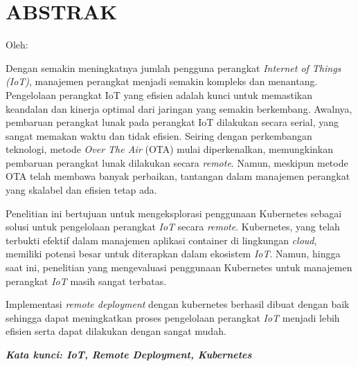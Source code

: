 \clearpage
\chapter*{ABSTRAK}
\begin{center}
  \center
  \begin{singlespace}
    \large\bfseries\MakeUppercase{\thetitle}
    
    \normalfont\normalsize
    Oleh:
    
    \bfseries \theauthor
  \end{singlespace}
\end{center}

\begin{singlespace}
  \small
  Dengan semakin meningkatnya jumlah pengguna perangkat \textit{Internet of Things (IoT)}, manajemen perangkat menjadi semakin kompleks dan menantang. Pengelolaan perangkat IoT yang efisien adalah kunci untuk memastikan keandalan dan kinerja optimal dari jaringan yang semakin berkembang. Awalnya, pembaruan perangkat lunak pada perangkat IoT dilakukan secara serial, yang sangat memakan waktu dan tidak efisien. Seiring dengan perkembangan teknologi, metode \textit{Over The Air} (OTA) mulai diperkenalkan, memungkinkan pembaruan perangkat lunak dilakukan secara \textit{remote}. Namun, meskipun metode OTA telah membawa banyak perbaikan, tantangan dalam manajemen perangkat yang skalabel dan efisien tetap ada.
  
  Penelitian ini bertujuan untuk mengeksplorasi penggunaan Kubernetes sebagai solusi untuk pengelolaan perangkat \textit{IoT} secara \textit{remote}. Kubernetes, yang telah terbukti efektif dalam manajemen aplikasi container di lingkungan \textit{cloud}, memiliki potensi besar untuk diterapkan dalam ekosistem \textit{IoT}. Namun, hingga saat ini, penelitian yang mengevaluasi penggunaan Kubernetes untuk manajemen perangkat \textit{IoT} masih sangat terbatas. 
  
  Implementasi \textit{remote deployment} dengan kubernetes berhasil dibuat dengan baik sehingga dapat meningkatkan proses pengelolaan perangkat \textit{IoT} menjadi lebih efisien serta dapat dilakukan dengan sangat mudah.
  
  \textbf{\textit{Kata kunci: IoT, Remote Deployment, Kubernetes }}
  
\end{singlespace}
\clearpage